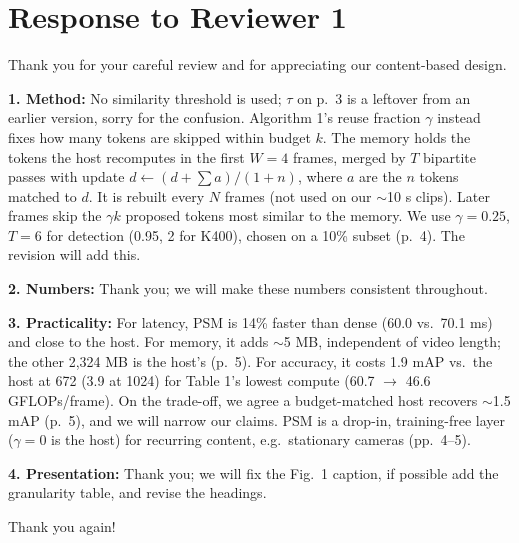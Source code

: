 \section*{Response to Reviewer 1}

Thank you for your careful review and for appreciating our content-based design.

\textbf{1. Method:} No similarity threshold is used; $\tau$ on p.~3 is a leftover from an earlier version, sorry for the confusion. Algorithm 1's reuse fraction $\gamma$ instead fixes how many tokens are skipped within budget $k$. The memory holds the tokens the host recomputes in the first $W=4$ frames, merged by $T$ bipartite passes with update $d \leftarrow (d + \sum a)/(1 + n)$, where $a$ are the $n$ tokens matched to $d$. It is rebuilt every $N$ frames (not used on our $\sim$10 s clips). Later frames skip the $\gamma k$ proposed tokens most similar to the memory. We use $\gamma = 0.25$, $T=6$ for detection (0.95, 2 for K400), chosen on a 10\% subset (p.~4). The revision will add this.

\textbf{2. Numbers:} Thank you; we will make these numbers consistent throughout.

\textbf{3. Practicality:} For latency, PSM is 14\% faster than dense (60.0 vs.\ 70.1 ms) and close to the host. For memory, it adds $\sim$5 MB, independent of video length; the other 2,324 MB is the host's (p.~5). For accuracy, it costs 1.9 mAP vs.\ the host at 672 (3.9 at 1024) for Table 1's lowest compute (60.7 $\rightarrow$ 46.6 GFLOPs/frame). On the trade-off, we agree a budget-matched host recovers $\sim$1.5 mAP (p.~5), and we will narrow our claims. PSM is a drop-in, training-free layer ($\gamma = 0$ is the host) for recurring content, e.g.\ stationary cameras (pp.~4--5).

\textbf{4. Presentation:} Thank you; we will fix the Fig.~1 caption, if possible add the granularity table, and revise the headings.

Thank you again!
